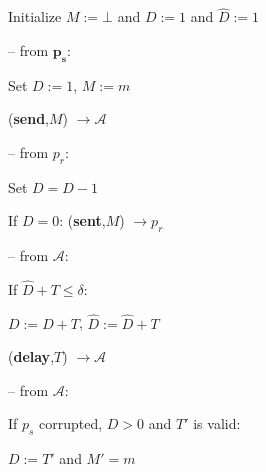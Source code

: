 \begin{bbox}[title={\textbf{Functionality} $\F_{\msf{BD-SEC}}^{\delta,\ell}(p_s,p_r)$}]

Initialize $M := \bot$ and $D := 1$ and $\hat{D} := 1$

-- \OnInput {} from $\mathbf{p_s}$:

	\qquad Set $D := 1$, $M := m$

	\qquad \Leak ({\bf send},$M$) $\rightarrow \mathcal{A}$

-- \OnInput {} from $p_r$:

	\qquad Set $D = D - 1$

	\qquad If $D = 0$: \Send ({\bf sent},$M$) $\rightarrow p_r$

-- \OnInput {} from $\mathcal{A}$:

	\qquad If $\hat{D} + T \leq \delta$: 

		\qquad \quad $D := D + T$, $\hat{D} := \hat{D} + T$

		\qquad \quad \Send ({\bf delay},$T$) $\rightarrow \mathcal{A}$

-- \OnInput {} from $\mathcal{A}$:

	\qquad If $p_s$ corrupted, $D > 0$ and $T'$ is valid:

		\qquad \quad $D := T'$ and $M' = m$
\end{bbox}

